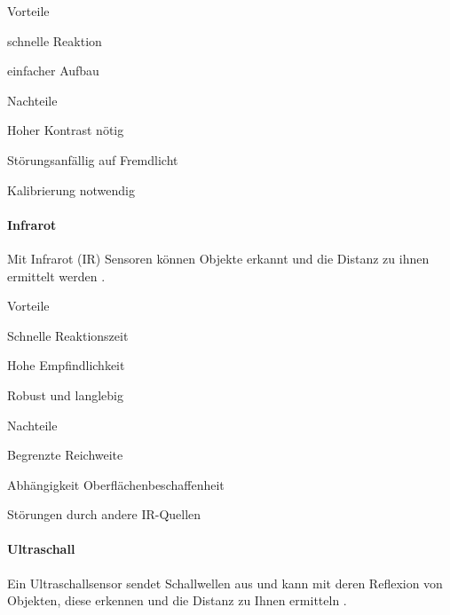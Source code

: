 \documentclass[../main.tex]{subfiles}
\begin{document}
\begin{minipage}[t]{0.48\textwidth}
\begin{items}
  \item [Vorteile]
  \item schnelle Reaktion
  \item einfacher Aufbau
\end{items}
\end{minipage}
\hfill
\begin{minipage}[t]{0.48\textwidth}
\begin{items}
  \item [Nachteile]
  \item Hoher Kontrast nötig
  \item Störungsanfällig auf Fremdlicht
  \item Kalibrierung notwendig
\end{items}
\end{minipage}

\paragraph{Infrarot}
Mit Infrarot (IR) Sensoren können Objekte erkannt und die Distanz zu ihnen ermittelt werden \cite{ir_sensor}.


\begin{minipage}[t]{0.48\textwidth}
\begin{items}
  \item [Vorteile]
  \item Schnelle Reaktionszeit
  \item Hohe Empfindlichkeit
  \item Robust und langlebig
\end{items}
\end{minipage}
\hfill
\begin{minipage}[t]{0.48\textwidth}
\begin{items}
  \item [Nachteile]
  \item Begrenzte Reichweite
  \item Abhängigkeit Oberflächenbeschaffenheit
  \item Störungen durch andere IR-Quellen
\end{items}
\end{minipage}

\paragraph{Ultraschall}
Ein Ultraschallsensor sendet Schallwellen aus und kann mit deren Reflexion von Objekten, diese erkennen und die Distanz zu Ihnen ermitteln \cite{ultraschall}.
\end{document}
